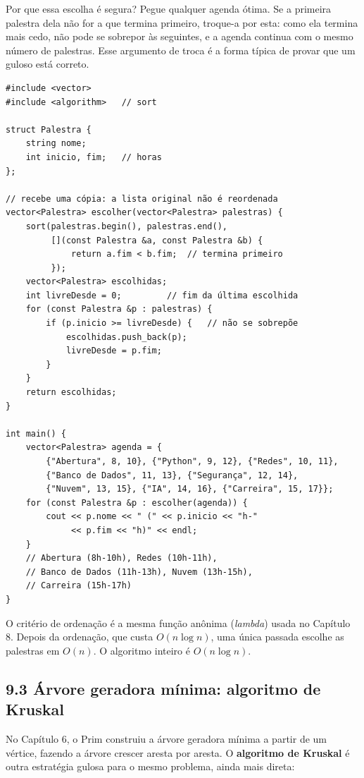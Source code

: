 Por que essa escolha é segura? Pegue qualquer agenda ótima. Se a primeira palestra dela não for a que termina primeiro, troque-a por esta: como ela termina mais cedo, não pode se sobrepor às seguintes, e a agenda continua com o mesmo número de palestras. Esse argumento de troca é a forma típica de provar que um guloso está correto.

\begin{codigo}
\begin{Verbatim}[breaklines=true, breaksymbolleft={}, fontsize=\footnotesize]
#include <vector>
#include <algorithm>   // sort

struct Palestra {
    string nome;
    int inicio, fim;   // horas
};

// recebe uma cópia: a lista original não é reordenada
vector<Palestra> escolher(vector<Palestra> palestras) {
    sort(palestras.begin(), palestras.end(),
         [](const Palestra &a, const Palestra &b) {
             return a.fim < b.fim;  // termina primeiro
         });
    vector<Palestra> escolhidas;
    int livreDesde = 0;         // fim da última escolhida
    for (const Palestra &p : palestras) {
        if (p.inicio >= livreDesde) {   // não se sobrepõe
            escolhidas.push_back(p);
            livreDesde = p.fim;
        }
    }
    return escolhidas;
}

int main() {
    vector<Palestra> agenda = {
        {"Abertura", 8, 10}, {"Python", 9, 12}, {"Redes", 10, 11},
        {"Banco de Dados", 11, 13}, {"Segurança", 12, 14},
        {"Nuvem", 13, 15}, {"IA", 14, 16}, {"Carreira", 15, 17}};
    for (const Palestra &p : escolher(agenda)) {
        cout << p.nome << " (" << p.inicio << "h-"
             << p.fim << "h)" << endl;
    }
    // Abertura (8h-10h), Redes (10h-11h),
    // Banco de Dados (11h-13h), Nuvem (13h-15h),
    // Carreira (15h-17h)
}
\end{Verbatim}
\end{codigo}

O critério de ordenação é a mesma função anônima (\textit{lambda}) usada no Capítulo 8. Depois da ordenação, que custa $O(n \log n)$, uma única passada escolhe as palestras em $O(n)$. O algoritmo inteiro é $O(n \log n)$.

\subsection{9.3 Árvore geradora mínima: algoritmo de Kruskal}

No Capítulo 6, o Prim construiu a árvore geradora mínima a partir de um vértice, fazendo a árvore crescer aresta por aresta. O \textbf{algoritmo de Kruskal} é outra estratégia gulosa para o mesmo problema, ainda mais direta:

